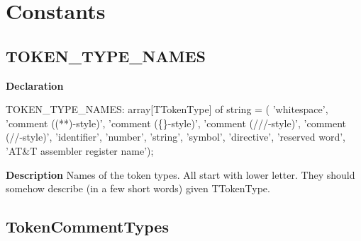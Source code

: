 \documentclass{report}
\newif\ifpdf
\begin{document}
\section{Constants}
\ifpdf
\subsection*{\large{\textbf{TOKEN{\_}TYPE{\_}NAMES}}\normalsize\hspace{1ex}\hrulefill}
\else
\subsection*{TOKEN{\_}TYPE{\_}NAMES}
\fi
\label{PasDoc_Tokenizer-TOKEN_TYPE_NAMES}
\begin{list}{}{
\setlength{\itemindent}{0cm}
\setlength{\listparindent}{0cm}
\setlength{\leftmargin}{\evensidemargin}
\addtolength{\leftmargin}{\tmplength}
\settowidth{\labelsep}{X}
\addtolength{\leftmargin}{\labelsep}
\setlength{\labelwidth}{\tmplength}
}
\item[\textbf{Declaration}\hfill]
\ifpdf
\begin{flushleft}
\fi
\begin{ttfamily}
TOKEN{\_}TYPE{\_}NAMES: array[TTokenType] of string =
  ( 'whitespace', 'comment ((**)-style)', 'comment ({\{}{\}}-style)',
    'comment (///-style)',
    'comment (//-style)', 'identifier', 'number', 'string', 'symbol',
    'directive', 'reserved word', 'AT{\&}T assembler register name');\end{ttfamily}

\ifpdf
\end{flushleft}
\fi

\par
\item[\textbf{Description}]
Names of the token types. All start with lower letter. They should somehow describe (in a few short words) given TTokenType.

\end{list}
\ifpdf
\subsection*{\large{\textbf{TokenCommentTypes}}\normalsize\hspace{1ex}\hrulefill}
\else
\end{document}
